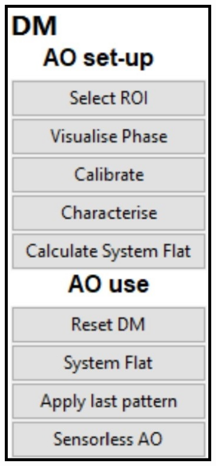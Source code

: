 \begin{figure}[H]
\begin{subfigure}{0.23\textwidth}
		\includegraphics[width=\linewidth]{images/DM_methods_cockpit.jpg}
		\caption{}
		\label{fig:DM_methods_cockpit}
	\end{subfigure}


\end{figure}
